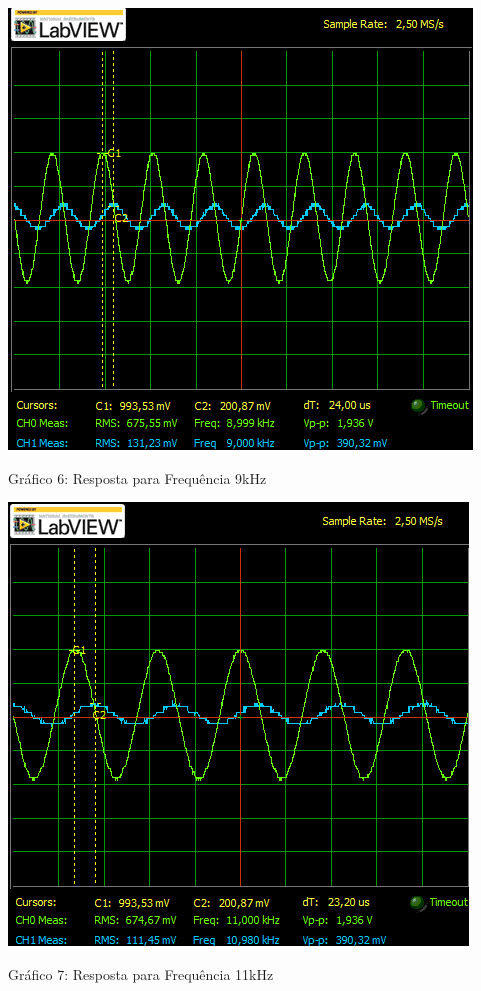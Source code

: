 \newpage
\begin{table}[h]
\centering
\includegraphics[scale=0.7]{graficos/RGADICOA9}
\end{table}
\begin{center}
Gráfico 6: Resposta para Frequência 9kHz
\end{center}


\begin{table}[h]
\centering
\includegraphics[scale=0.7]{graficos/RGADICOA11}
\end{table}
\begin{center}
Gráfico 7: Resposta para Frequência 11kHz
\end{center}

